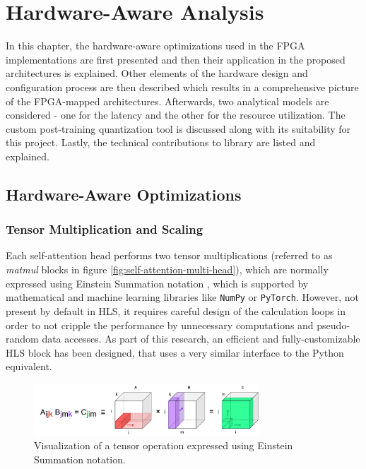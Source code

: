 \chapter{Hardware-Aware Analysis}\label{quantization}
In this chapter, the hardware-aware optimizations used in the FPGA implementations are first presented and then their application in the proposed architectures is explained. Other elements of the hardware design and configuration process are then described which results in a comprehensive picture of the FPGA-mapped architectures. Afterwards, two analytical models are considered - one for the latency and the other for the resource utilization. The custom post-training quantization tool is discussed along with its suitability for this project.
Lastly, the technical contributions to \hlsml library are listed and explained.

\section{Hardware-Aware Optimizations}

\subsection{Tensor Multiplication and Scaling}\label{tensor-multiplication}
Each self-attention head performs two tensor multiplications (referred to as \textit{matmul} blocks in figure \ref{fig:self-attention-multi-head}), which are normally expressed using Einstein Summation notation \cite{59-barr1991einstein}, which is supported by mathematical and machine learning libraries like \texttt{NumPy} or \texttt{PyTorch}. However, not present by default in HLS, it requires careful design of the calculation loops in order to not cripple the performance by unnecessary computations and pseudo-random data accesses. As part of this research, an efficient and fully-customizable HLS block has been designed, that uses a very similar interface to the Python equivalent.

\begin{figure}[hpt!]
  \centering
  \includegraphics[trim={0cm 0cm 0cm 0cm}, width=0.75\textwidth, center]{models/einsum.pdf}
  \caption{Visualization of a tensor operation expressed using Einstein Summation notation.}
  \label{fig:einsum}
\end{figure}


